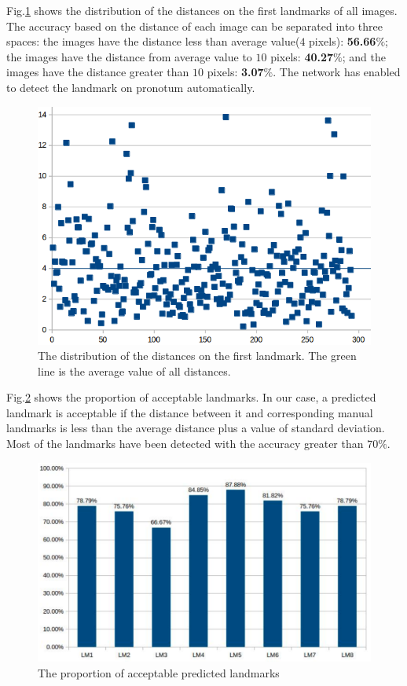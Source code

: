 \documentclass[conference]{IEEEtran}
\begin{document}
Fig.\ref{figchartlm1} shows the distribution of the distances on the first landmarks of all images. The accuracy based on the distance of each image can be separated into three spaces: the images have the distance less than average value($4$ pixels): \textbf{56.66$\%$}; the images have the distance from average value to $10$ pixels: \textbf{40.27$\%$}; and the images have the distance greater than $10$ pixels: \textbf{3.07$\%$}. The network has enabled to detect the landmark on pronotum automatically. %

\begin{figure}[htbp]
	\centerline{\includegraphics[scale=0.3]{images/statistic}}
	\caption{The distribution of the distances on the first landmark. The green line is the average value of all distances.}
	\label{figchartlm1}
\end{figure}
Fig.\ref{figchart} shows the proportion of acceptable landmarks. In our case, a predicted landmark is acceptable if the distance between it and corresponding manual landmarks is less than the average distance plus a value of standard deviation. Most of the landmarks have been detected with the accuracy greater than $70\%$. %

\begin{figure}[htbp]
	\centerline{\includegraphics[scale=0.2]{images/chart}}
	\caption{The proportion of acceptable predicted landmarks}
	\label{figchart}
\end{figure}
\end{document}
